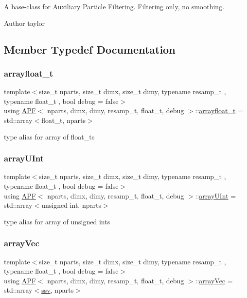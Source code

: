 A base-\/class for Auxiliary Particle Filtering. Filtering only, no smoothing. 

\begin{DoxyAuthor}{Author}
taylor 
\end{DoxyAuthor}


\subsection{Member Typedef Documentation}
\mbox{\label{classAPF_a5442e395afcd4c0712e58fdd103d4d52}} 
\subsubsection{\texorpdfstring{arrayfloat\+\_\+t}{arrayfloat\_t}}
{\footnotesize\ttfamily template$<$size\+\_\+t nparts, size\+\_\+t dimx, size\+\_\+t dimy, typename resamp\+\_\+t , typename float\+\_\+t , bool debug = false$>$ \\
using \hyperlink{classAPF}{A\+PF}$<$ nparts, dimx, dimy, resamp\+\_\+t, float\+\_\+t, debug $>$\+::\hyperlink{classAPF_a5442e395afcd4c0712e58fdd103d4d52}{arrayfloat\+\_\+t} =  std\+::array$<$float\+\_\+t, nparts$>$}

type alias for array of float\+\_\+ts \mbox{\label{classAPF_a89fadc4d61a1cb4eaa63d3fca4d43284}} 
\subsubsection{\texorpdfstring{array\+U\+Int}{arrayUInt}}
{\footnotesize\ttfamily template$<$size\+\_\+t nparts, size\+\_\+t dimx, size\+\_\+t dimy, typename resamp\+\_\+t , typename float\+\_\+t , bool debug = false$>$ \\
using \hyperlink{classAPF}{A\+PF}$<$ nparts, dimx, dimy, resamp\+\_\+t, float\+\_\+t, debug $>$\+::\hyperlink{classAPF_a89fadc4d61a1cb4eaa63d3fca4d43284}{array\+U\+Int} =  std\+::array$<$unsigned int, nparts$>$}

type alias for array of unsigned ints \mbox{\label{classAPF_a56d9b8e823c69721d7f19a657b0509ed}} 
\subsubsection{\texorpdfstring{array\+Vec}{arrayVec}}
{\footnotesize\ttfamily template$<$size\+\_\+t nparts, size\+\_\+t dimx, size\+\_\+t dimy, typename resamp\+\_\+t , typename float\+\_\+t , bool debug = false$>$ \\
using \hyperlink{classAPF}{A\+PF}$<$ nparts, dimx, dimy, resamp\+\_\+t, float\+\_\+t, debug $>$\+::\hyperlink{classAPF_a56d9b8e823c69721d7f19a657b0509ed}{array\+Vec} =  std\+::array$<$\hyperlink{classAPF_a8b170471292cd6fb5c3c19b55b42fc4e}{ssv}, nparts$>$}

